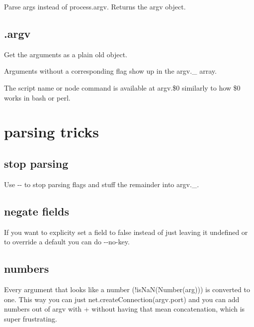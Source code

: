 Parse {\ttfamily args} instead of {\ttfamily process.\+argv}. Returns the {\ttfamily argv} object.

\subsection*{.argv }

Get the arguments as a plain old object.

Arguments without a corresponding flag show up in the {\ttfamily argv.\+\_\+} array.

The script name or node command is available at {\ttfamily argv.\$0} similarly to how {\ttfamily \$0} works in bash or perl.

\section*{parsing tricks }

\subsection*{stop parsing }

Use {\ttfamily -\/-\/} to stop parsing flags and stuff the remainder into {\ttfamily argv.\+\_\+}. 


\subsection*{negate fields }

If you want to explicity set a field to false instead of just leaving it undefined or to override a default you can do {\ttfamily -\/-\/no-\/key}. 


\subsection*{numbers }

Every argument that looks like a number ({\ttfamily !is\+NaN(Number(arg))}) is converted to one. This way you can just {\ttfamily net.\+create\+Connection(argv.\+port)} and you can add numbers out of {\ttfamily argv} with {\ttfamily +} without having that mean concatenation, which is super frustrating.

